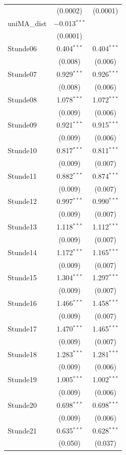 \documentclass[a4paper,12pt]{thesis}
\begin{document}
\begin{longtable}{@{\extracolsep{-5pt}}lcc}
		& (0.0002) & (0.0001) \\ 
		uniMA\_dist & $-$0.013$^{***}$ &  \\ 
		& (0.0001) &  \\ 
		Stunde06 & 0.404$^{***}$ & 0.404$^{***}$ \\ 
		& (0.008) & (0.006) \\ 
		Stunde07 & 0.929$^{***}$ & 0.926$^{***}$ \\ 
		& (0.008) & (0.006) \\ 
		Stunde08 & 1.078$^{***}$ & 1.072$^{***}$ \\ 
		& (0.009) & (0.006) \\ 
		Stunde09 & 0.921$^{***}$ & 0.915$^{***}$ \\ 
		& (0.009) & (0.006) \\ 
		Stunde10 & 0.817$^{***}$ & 0.811$^{***}$ \\ 
		& (0.009) & (0.007) \\ 
		Stunde11 & 0.882$^{***}$ & 0.874$^{***}$ \\ 
		& (0.009) & (0.007) \\ 
		Stunde12 & 0.997$^{***}$ & 0.990$^{***}$ \\ 
		& (0.009) & (0.007) \\ 
		Stunde13 & 1.118$^{***}$ & 1.112$^{***}$ \\ 
		& (0.009) & (0.007) \\ 
		Stunde14 & 1.172$^{***}$ & 1.165$^{***}$ \\ 
		& (0.009) & (0.007) \\ 
		Stunde15 & 1.304$^{***}$ & 1.297$^{***}$ \\ 
		& (0.009) & (0.007) \\ 
		Stunde16 & 1.466$^{***}$ & 1.458$^{***}$ \\ 
		& (0.009) & (0.007) \\ 
		Stunde17 & 1.470$^{***}$ & 1.465$^{***}$ \\ 
		& (0.009) & (0.007) \\ 
		Stunde18 & 1.283$^{***}$ & 1.281$^{***}$ \\ 
		& (0.009) & (0.006) \\ 
		Stunde19 & 1.005$^{***}$ & 1.002$^{***}$ \\ 
		& (0.009) & (0.006) \\ 
		Stunde20 & 0.698$^{***}$ & 0.698$^{***}$ \\ 
		& (0.009) & (0.006) \\ 
		Stunde21 & 0.635$^{***}$ & 0.628$^{***}$ \\ 
		& (0.050) & (0.037) \\ 

\end{longtable}
\end{document}
